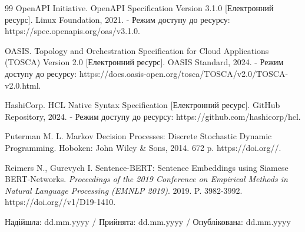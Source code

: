 \documentclass[12pt, reqno, a4paper]{amsart}
\theoremstyle{definition}
\theoremstyle{plain}
\theoremstyle{plain}
\theoremstyle{plain}
\theoremstyle{remark}
\theoremstyle{plain}
\begin{document}
{\begin{thebibliography}{99}
 OpenAPI Initiative. OpenAPI Specification Version 3.1.0 [Електронний ресурс]. Linux Foundation, 2021. - Режим доступу до ресурсу: https://spec.openapis.org/\allowbreak oas/\allowbreak v3.1.0.

 OASIS. Topology and Orchestration Specification for Cloud Applications (TOSCA) Version 2.0 [Електронний ресурс]. OASIS Standard, 2024. - Режим доступу до ресурсу: https://docs.oasis-open.org/\allowbreak tosca/\allowbreak TOSCA/\allowbreak v2.0/\allowbreak TOSCA-v2.0.html.

 HashiCorp. HCL Native Syntax Specification [Електронний ресурс]. GitHub Repository, 2024. - Режим доступу до ресурсу: https://github.com/\allowbreak hashicorp/\allowbreak hcl.

 Puterman M. L. Markov Decision Processes: Discrete Stochastic Dynamic Programming. Hoboken: John Wiley \& Sons, 2014. 672 p. https://doi.org//.

 Reimers N., Gurevych I. Sentence-BERT: Sentence Embeddings using Siamese BERT-Networks. \emph{Proceedings of the 2019 Conference on Empirical Methods in Natural Language Processing (EMNLP 2019)}. 2019. P. 3982-3992. https://doi.org//\allowbreak v1/\allowbreak D19-1410.

\end{thebibliography}

\bigskip

\begin{flushright}
Надійшла: dd.mm.yyyy / Прийнята: dd.mm.yyyy / Опублікована: dd.mm.yyyy
\end{flushright}

}
\end{document}
